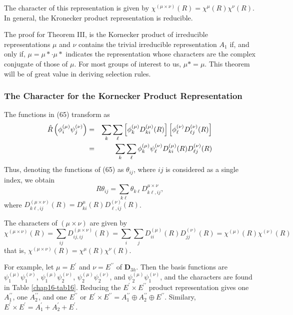 The character of this representation is given by $\chi^{( \mu \times 
\nu)} (R) = \chi^{\mu}(R) \chi^{\nu}(R)$.  In general, the Kronecker 
product representation is reducible.

The proof for Theorem III, is the Kornecker product of 
irreducible representations $\mu$ and $\nu$ contains the trivial 
irreducible representation $A_1$ if, and only if, $\mu = \mu * \cdot 
\mu*$ indicates the representation whose characters are the complex 
conjugate of those of $\mu$.  For most groups of interest to us, 
$\mu * = \mu$.  This theorem will be of great value in deriving 
selection rules.

\subsubsection{The Character for the Kornecker Product Representation}

The functions in (65) transform as
\begin{eqnarray}
{\hat{R}} \left( \phi^{(\mu)}_i \psi^{(\nu)}_j \right) &=& \sum_{k} 
\sum_{\ell} \left[ \phi^{(\mu)}_k D^{(\mu)}_{ki} (R) \right] \left[ 
\phi^{(\nu)}_{\ell} D^{(\nu)}_{\ell j} (R) \right]\cr
&=& \sum_{k} 
\sum_{\ell} \phi^{(\mu)}_k \psi^{(\nu)}_{\ell} D^{(\mu)}_{ki} (R) 
D^{(\nu)}_{\ell j} (R)
\end{eqnarray}
Thus, denoting the functions of (65) as $\theta_{ij}$, where $ij$ is 
considered as a single index, we obtain
\begin{equation} 
R
\theta_{ij} = \sum_{k \ell} \theta_{k \ell} D^{\mu \times \nu}_{k 
\ell , ij} ,
\end{equation}
where $D^{(\mu \times \nu)}_{k 
\ell , ij} (R) = D^{\mu}_{ki} (R) D^{(\nu)}_{\ell , ij} (R)$.

The characters of $(\mu \times \nu)$ are given by
\begin{equation}
\chi^{(\mu \times \nu)} (R) = \sum_{ij} D^{(\mu \times \nu)}_{ij,ij} 
(R) = \sum_{i} \sum_{j} D^{(\mu)}_{ii} (R) D^{(\nu)}_{jj} (R) = 
\chi^{(\mu)}(R) \chi^{(\nu)} (R)
\end{equation}
that is, $\chi^{(\mu \times \nu)}(R) = \chi^{\mu}(R) \chi^{\nu}(R)$.

For example, let $\mu = E^{\prime}$ and $\nu = E^{\prime \prime}$ of
{\bf D}$_{3h}$.  Then the basis functions are
$\psi_1^{(\mu)}\psi_1^{(\nu)}$, $\psi_1^{(\mu)}\psi_2^{(\nu)}$,
$\psi_2^{(\mu)}\psi_2^{(\nu)}$, and $\psi_2^{(\mu)}\psi_1^{(\nu)}$,
and the characters are found in Table \ref{chap16-tab16}.  Reducing
the $E^{\prime} \times E^{\prime \prime}$ product representation gives
one $A^{\prime \prime}_1$, one $A^{\prime \prime}_2$, and one
$E^{\prime \prime}$ or $E^{\prime} \times E^{\prime \prime} =
A^{\prime \prime}_1 \oplus A^{\prime \prime}_2 \oplus E^{\prime
\prime}$.  Similary, $E^{\prime} \times E^{\prime} = A^{\prime}_1 +
A^{\prime}_2 + E^{\prime}$.

